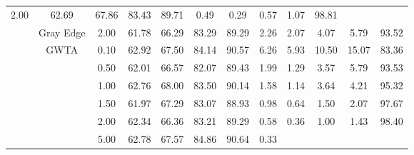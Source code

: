 \begin{table}[htbp]
{\begin{tabular}{cc|c|ccccccccc}
  2.00 &
  \multicolumn{1}{c|}{62.69} &
  \multicolumn{1}{c|}{67.86} &
  \multicolumn{1}{c|}{83.43} &
  \multicolumn{1}{c|}{89.71} &
  \multicolumn{1}{c|}{0.49} &
  \multicolumn{1}{c|}{0.29} &
  \multicolumn{1}{c|}{0.57} &
  \multicolumn{1}{c|}{1.07} &
  98.81 \\ \cline{2-12} 
\multicolumn{1}{c|}{} &
  Gray Edge &
  2.00 &
  \multicolumn{1}{c|}{61.78} &
  \multicolumn{1}{c|}{66.29} &
  \multicolumn{1}{c|}{83.29} &
  \multicolumn{1}{c|}{89.29} &
  \multicolumn{1}{c|}{2.26} &
  \multicolumn{1}{c|}{2.07} &
  \multicolumn{1}{c|}{4.07} &
  \multicolumn{1}{c|}{5.79} &
  93.52 \\ \cline{2-12} 
\multicolumn{1}{c|}{} &
  \multirow{9}{*}{GWTA} &
  0.10 &
  \multicolumn{1}{c|}{62.92} &
  \multicolumn{1}{c|}{67.50} &
  \multicolumn{1}{c|}{84.14} &
  \multicolumn{1}{c|}{90.57} &
  \multicolumn{1}{c|}{6.26} &
  \multicolumn{1}{c|}{5.93} &
  \multicolumn{1}{c|}{10.50} &
  \multicolumn{1}{c|}{15.07} &
  83.36 \\ \cline{3-12} 
\multicolumn{1}{c|}{} &
   &
  0.50 &
  \multicolumn{1}{c|}{62.01} &
  \multicolumn{1}{c|}{66.57} &
  \multicolumn{1}{c|}{82.07} &
  \multicolumn{1}{c|}{89.43} &
  \multicolumn{1}{c|}{1.99} &
  \multicolumn{1}{c|}{1.29} &
  \multicolumn{1}{c|}{3.57} &
  \multicolumn{1}{c|}{5.79} &
  93.53 \\ \cline{3-12} 
\multicolumn{1}{c|}{} &
   &
  1.00 &
  \multicolumn{1}{c|}{62.76} &
  \multicolumn{1}{c|}{68.00} &
  \multicolumn{1}{c|}{83.50} &
  \multicolumn{1}{c|}{90.14} &
  \multicolumn{1}{c|}{1.58} &
  \multicolumn{1}{c|}{1.14} &
  \multicolumn{1}{c|}{3.64} &
  \multicolumn{1}{c|}{4.21} &
  95.32 \\ \cline{3-12} 
\multicolumn{1}{c|}{} &
   &
  1.50 &
  \multicolumn{1}{c|}{61.97} &
  \multicolumn{1}{c|}{67.29} &
  \multicolumn{1}{c|}{83.07} &
  \multicolumn{1}{c|}{88.93} &
  \multicolumn{1}{c|}{0.98} &
  \multicolumn{1}{c|}{0.64} &
  \multicolumn{1}{c|}{1.50} &
  \multicolumn{1}{c|}{2.07} &
  97.67 \\ \cline{3-12} 
\multicolumn{1}{c|}{} &
   &
  2.00 &
  \multicolumn{1}{c|}{62.34} &
  \multicolumn{1}{c|}{66.36} &
  \multicolumn{1}{c|}{83.21} &
  \multicolumn{1}{c|}{89.29} &
  \multicolumn{1}{c|}{0.58} &
  \multicolumn{1}{c|}{0.36} &
  \multicolumn{1}{c|}{1.00} &
  \multicolumn{1}{c|}{1.43} &
  98.40 \\ \cline{3-12} 
\multicolumn{1}{c|}{} &
   &
  5.00 &
  \multicolumn{1}{c|}{62.78} &
  \multicolumn{1}{c|}{67.57} &
  \multicolumn{1}{c|}{84.86} &
  \multicolumn{1}{c|}{90.64} &
  \multicolumn{1}{c|}{0.33} &

\end{tabular}}
\end{table}
